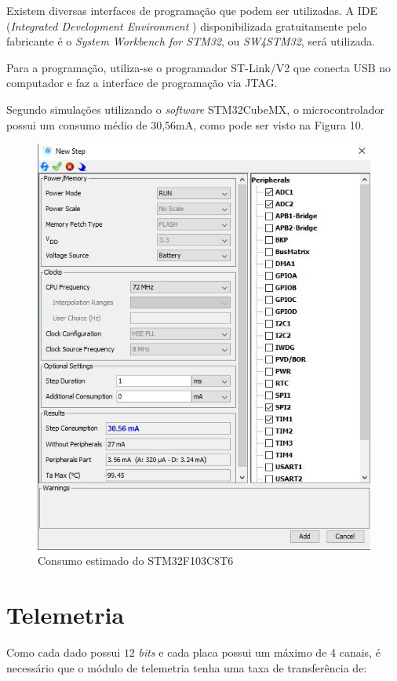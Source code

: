 \documentclass[11pt]{abntex2}
\begin{document}
			Existem diversas interfaces de programação que podem ser
			utilizadas. A IDE (\textit{Integrated Development Environment })
			disponibilizada gratuitamente pelo fabricante é o \textit{System
			Workbench for STM32}, ou \textit{SW4STM32}, será utilizada.

			Para a programação, utiliza-se o programador ST-Link/V2 que
			conecta USB no computador e faz a interface de programação via
			JTAG.

			Segundo simulações utilizando o \textit{software} STM32CubeMX, o
			microcontrolador possui um consumo médio de 30,56mA, como pode ser
			visto na Figura 10.

			\begin{figure}[!ht]
				\centering
				\includegraphics[scale = 0.6]{../Fotos/stmConsumo.jpg}
				\caption{Consumo estimado do STM32F103C8T6}
			\end{figure}


		\section{Telemetria}
			Como cada dado possui $12$ \textit{bits} e cada placa possui um
			máximo de 4 canais, é necessário que o módulo de telemetria
			tenha uma taxa de transferência de:
\end{document}
